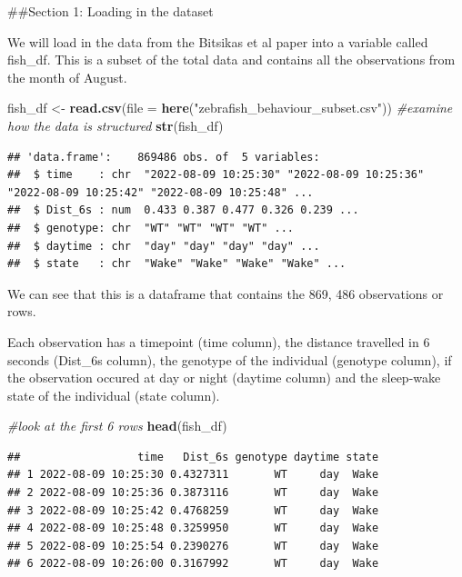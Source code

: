 \documentclass[
]{article}
\newenvironment{Shaded}{\begin{snugshade}}{\end{snugshade}}
\newcommand{\AttributeTok}[1]{\textcolor[rgb]{0.13,0.29,0.53}{#1}}
\newcommand{\CommentTok}[1]{\textcolor[rgb]{0.56,0.35,0.01}{\textit{#1}}}
\newcommand{\FunctionTok}[1]{\textcolor[rgb]{0.13,0.29,0.53}{\textbf{#1}}}
\newcommand{\NormalTok}[1]{#1}
\newcommand{\OtherTok}[1]{\textcolor[rgb]{0.56,0.35,0.01}{#1}}
\newcommand{\StringTok}[1]{\textcolor[rgb]{0.31,0.60,0.02}{#1}}
\begin{document}
\#\#Section 1: Loading in the dataset

We will load in the data from the Bitsikas et al paper into a variable
called fish\_df. This is a subset of the total data and contains all the
observations from the month of August.

\begin{Shaded}
\begin{Highlighting}[]
\NormalTok{fish\_df }\OtherTok{\textless{}{-}} \FunctionTok{read.csv}\NormalTok{(}\AttributeTok{file =} \FunctionTok{here}\NormalTok{(}\StringTok{"zebrafish\_behaviour\_subset.csv"}\NormalTok{))}
\CommentTok{\#examine how the data is structured}
\FunctionTok{str}\NormalTok{(fish\_df)}
\end{Highlighting}
\end{Shaded}

\begin{verbatim}
## 'data.frame':    869486 obs. of  5 variables:
##  $ time    : chr  "2022-08-09 10:25:30" "2022-08-09 10:25:36" "2022-08-09 10:25:42" "2022-08-09 10:25:48" ...
##  $ Dist_6s : num  0.433 0.387 0.477 0.326 0.239 ...
##  $ genotype: chr  "WT" "WT" "WT" "WT" ...
##  $ daytime : chr  "day" "day" "day" "day" ...
##  $ state   : chr  "Wake" "Wake" "Wake" "Wake" ...
\end{verbatim}

We can see that this is a dataframe that contains the 869, 486
observations or rows.

Each observation has a timepoint (time column), the distance travelled
in 6 seconds (Dist\_6s column), the genotype of the individual (genotype
column), if the observation occured at day or night (daytime column) and
the sleep-wake state of the individual (state column).

\begin{Shaded}
\begin{Highlighting}[]
\CommentTok{\#look at the first 6 rows}
\FunctionTok{head}\NormalTok{(fish\_df)}
\end{Highlighting}
\end{Shaded}

\begin{verbatim}
##                  time   Dist_6s genotype daytime state
## 1 2022-08-09 10:25:30 0.4327311       WT     day  Wake
## 2 2022-08-09 10:25:36 0.3873116       WT     day  Wake
## 3 2022-08-09 10:25:42 0.4768259       WT     day  Wake
## 4 2022-08-09 10:25:48 0.3259950       WT     day  Wake
## 5 2022-08-09 10:25:54 0.2390276       WT     day  Wake
## 6 2022-08-09 10:26:00 0.3167992       WT     day  Wake
\end{verbatim}
\end{document}
